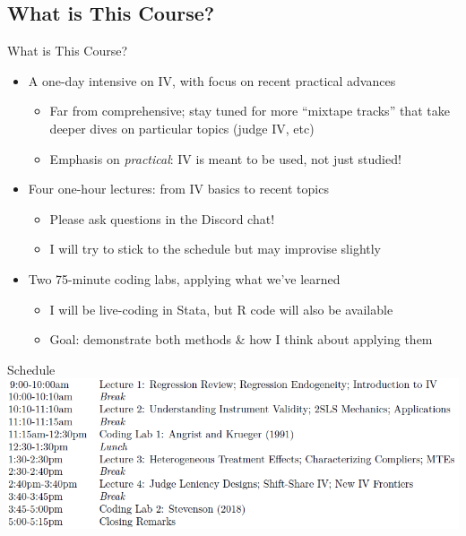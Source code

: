 \documentclass{beamer}
\begin{document}
\subsection{What is This Course?}
\begin{frame}{What is This Course?}
\begin{itemize}
\item A one-day intensive on IV, with focus on recent practical advances \pause{}\smallskip
\begin{itemize}
\item Far from comprehensive; stay tuned for more ``mixtape tracks'' that take deeper dives on particular topics (judge IV, etc)\smallskip
\item Emphasis on \emph{practical}: IV is meant to be used, not just studied!
\end{itemize}\pause{}\medskip
\item Four one-hour lectures: from IV basics to recent topics\pause{}
\begin{itemize}
\item Please ask questions in the Discord chat!\smallskip
\item I will try to stick to the schedule but may improvise slightly
\end{itemize}\pause{}\medskip
\item Two 75-minute coding labs, applying what we've learned\pause{}\smallskip
\begin{itemize}
\item I will be live-coding in Stata, but R code will also be available\smallskip
\item Goal: demonstrate both methods \& how I think about applying them
\end{itemize}
\end{itemize}
\end{frame}

\begin{frame}{Schedule}
\includegraphics[scale=0.55]{./lecture_includes/schedule.png}
\end{frame}
\end{document}
